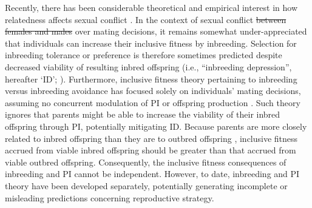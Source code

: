\documentclass[12pt]{article}
\begin{document}
{\color{blue}Recently, there has been considerable theoretical and empirical interest in how relatedness affects sexual conflict \cite[e.g., ][]{Pizzari2012, Carazo2014, Chippindale2015, Faria2015, Martin2015}.} In the context of sexual conflict {\color{red}\st{between females and males}} over mating decisions, it remains somewhat under-appreciated that individuals can increase their inclusive fitness by inbreeding. Selection for inbreeding tolerance or preference is therefore sometimes predicted despite decreased viability of resulting inbred offspring (i.e., ``inbreeding depression'', hereafter `ID'; \cite[][]{Parker1979, Parker2006}). Furthermore, inclusive fitness theory pertaining to inbreeding versus inbreeding avoidance has focused solely on individuals' mating decisions, assuming no concurrent modulation of PI or offspring production \cite[][]{Parker2006, Kokko2006, Duthie2015a}. Such theory ignores that parents might be able to increase the viability of their inbred offspring through PI, potentially mitigating ID. Because parents are more closely related to inbred offspring than they are to outbred offspring \cite[][]{Trivers1974, Lynch1998, Reid2016}, inclusive fitness accrued from viable inbred offspring should be greater than that accrued from viable outbred offspring. Consequently, the inclusive fitness consequences of inbreeding and PI cannot be independent. However, to date, inbreeding and PI theory have been developed separately, potentially generating incomplete or misleading predictions concerning reproductive strategy.
\end{document}
